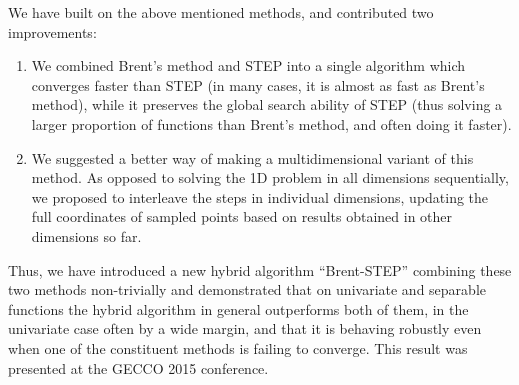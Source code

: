 We have built on the above mentioned methods, and contributed two improvements:

\begin{enumerate}
	\item We combined Brent's method and STEP into a single algorithm which converges faster than STEP (in many cases, it is almost as fast as Brent's method), while it preserves the global search ability of STEP (thus solving a larger proportion of functions than Brent's method, and often doing it faster).

	\item We suggested a better way of making a multidimensional variant of this method. As opposed to solving the 1D problem in all dimensions sequentially, we proposed to interleave the steps in individual dimensions, updating the full coordinates of sampled points based on results obtained in other dimensions so far.
\end{enumerate}

Thus, we have introduced a new hybrid algorithm ``Brent-STEP'' combining
these two methods non-trivially and demonstrated that
on univariate and separable functions the hybrid algorithm
in general outperforms both of them,
in the univariate case often by a wide margin,
and that it is behaving robustly even when one of the constituent methods
is failing to converge.
This result was presented at the GECCO 2015 conference.
\citep{ndsqistep}
